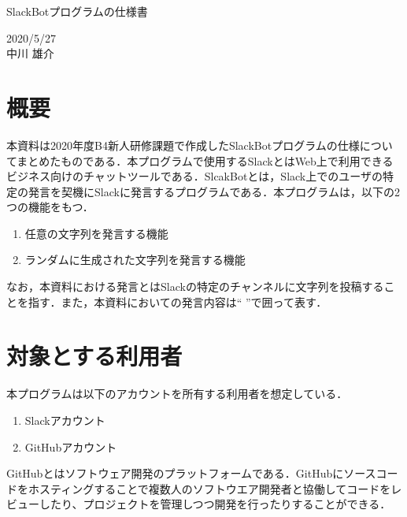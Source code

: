 \documentclass[12pt]{jsarticle}
\begin{document}
\begin{center}
{\LARGE SlackBotプログラムの仕様書}
\end{center}

\begin{flushright}
  2020/5/27\\
  中川 雄介
\end{flushright}
\section{概要}
\label{sec:introduction}
本資料は2020年度B4新人研修課題で作成したSlackBotプログラムの仕様についてまとめたものである．本プログラムで使用するSlackとはWeb上で利用できるビジネス向けのチャットツールである．SlcakBotとは，Slack上でのユーザの特定の発言を契機にSlackに発言するプログラムである．本プログラムは，以下の2つの機能をもつ．
\begin{enumerate}
\item 任意の文字列を発言する機能
\item ランダムに生成された文字列を発言する機能
\end{enumerate}
なお，本資料における発言とはSlackの特定のチャンネルに文字列を投稿することを指す．また，本資料においての発言内容は`` ''で囲って表す．


\section{対象とする利用者}\label{sec:user}
本プログラムは以下のアカウントを所有する利用者を想定している．
\begin{enumerate}
\item Slackアカウント
\item GitHubアカウント 
\end{enumerate}
GitHubとはソフトウェア開発のプラットフォームである．GitHubにソースコードをホスティングすることで複数人のソフトウエア開発者と協働してコードをレビューしたり、プロジェクトを管理しつつ開発を行ったりすることができる．
\end{document}
